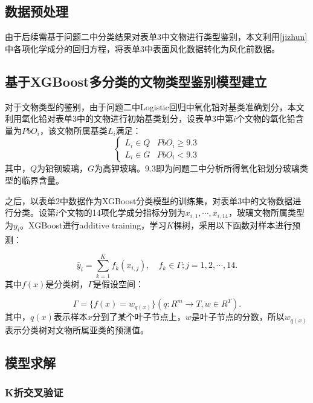 \documentclass[withoutpreface,bwprint]{cumcmthesis} %
\begin{document}
\subsection{数据预处理}

由于后续需基于问题二中分类结果对表单3中文物进行类型鉴别，本文利用\ref{jizhun}中各项化学成分的回归方程，将表单3中表面风化数据转化为风化前数据。

\subsection{基于XGBoost多分类的文物类型鉴别模型建立}

对于文物类型的鉴别，由于问题二中Logistic回归中氧化铅对基类准确划分，本文利用氧化铅对表单3中的文物进行初始基类划分，设表单3中第$i$个文物的氧化铅含量为$PbO_i$，该文物所属基类$L_i$满足：
\begin{equation}
  \begin{cases}
    {L_i \in Q} & {PbO_i \geq 9.3}\\ {L_i \in G} & {PbO_i < 9.3}
  \end{cases}
\end{equation}
其中，$Q$为铅钡玻璃，$G$为高钾玻璃。9.3即为问题二中分析所得氧化铅划分玻璃类型的临界含量。

之后，以表单2中数据作为XGBoost分类模型的训练集，对表单3中的文物数据进行分类。设第$i$个文物的14项化学成分指标分别为$x_{i,1},\cdots,x_{i,14}$，玻璃文物所属类型为$y_{i}$。XGBoost进行additive training，学习$K$棵树，采用以下函数对样本进行预测\textsuperscript{\cite{ref9}}：

\begin{equation}
  \tilde { y_{i} } =  \sum _ { k = 1 } ^ { K } f _ { k } ( x _ { i,j} ) ,\quad f _ { k } \in \Gamma;j=1,2,\cdots,14.
  \label{shi1}
\end{equation}
其中$f(x)$是分类树，$\Gamma$是假设空间：

\begin{equation}
  \Gamma = \{ f ( x ) = w _ { q ( x ) } \} ( q : R ^ { m } \rightarrow T , w \in R ^ { T } ).
  \label{shi2}
\end{equation}
其中，$q(x)$表示样本$x$分到了某个叶子节点上，$w$是叶子节点的分数，所以$w _ { q ( x ) }$表示分类树对文物所属亚类的预测值。


\subsection{模型求解}

\subsubsection{K折交叉验证}
\end{document}
